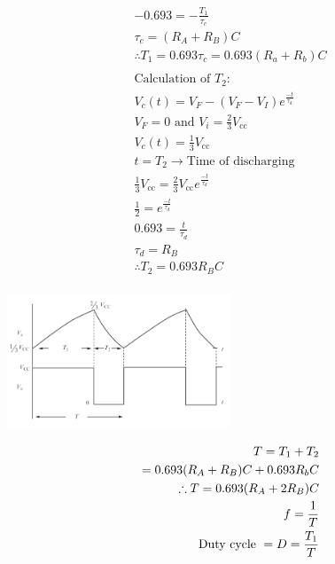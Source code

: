 \documentclass[a4paper, 12pt]{report}
\begin{document}
\begin{center}
\begin{center}
\begin{center}
\begin{center}
\begin{center}
\begin{center}
\begin{center}
\begin{center}
\begin{center}
\begin{center}
\begin{center}
\begin{center}
\begin{multicols}{2}
\begin{equation}
\begin{align}
            -0.693 = -\frac{T_1}{\tau_c}\\
            \tau_c = (R_A + R_B)C\\
            \therefore T_1 = 0.693\tau_c = 0.693(R_a+R_b)C\\\\
            \text{Calculation\ of\ } T_2:\\
            V_c(t) = V_F - (V_F - V_I)e^{\frac{-t}{\tau_d}}\\
            V_F = 0 \text{\ and\ } V_i = \frac{2}{3}V_\text{cc}\\
            V_c(t) = \frac{1}{3}V_\text{cc}\\
            t = T_2 \rightarrow \text{Time\ of\ discharging}\\
            \frac{1}{3}V_\text{cc} = \frac{2}{3}V_\text{cc} e^{\frac{-t}{\tau_d}}\\
            \frac{1}{2} = e^{\frac{-t}{\tau_d}}\\
            0.693 = \frac{t}{\tau_d}\\
            \tau_d = R_B\\
            \therefore T_2 = 0.693R_BC\\
        \end{align}
    \end{equation}
    \begin{center}
    \includegraphics[width=0.5\textwidth]{figures/32c2.png}
    \end{center}
\begin{equation}\notag
        \begin{align}
            T = T_1+T_2 \\
            = 0.693(R_A+R_B)C + 0.693R_bC \\
            \therefore T = 0.693(R_A+2R_B)C \\
            f = \frac{1}{T}\\
            \text{Duty\ cycle\ } = D = \frac{T_1}{T}
        \end{align}
    \end{equation}
    \begin{center}

\end{center}
\end{multicols}
\end{center}
\end{center}
\end{center}
\end{center}
\end{center}
\end{center}
\end{center}
\end{center}
\end{center}
\end{center}
\end{center}
\end{center}
\end{document}
